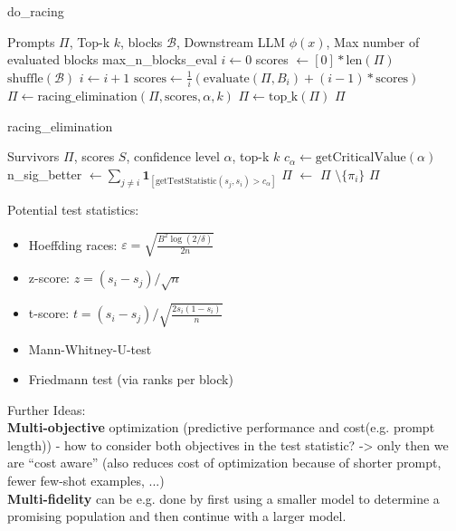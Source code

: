 \clearpage
\begin{algorithm}
    \caption{do\_racing}
    \begin{algorithmic}[1]
        \Require Prompts $\Pi$, Top-k $k$, blocks $\mathcal{B}$, Downstream LLM $\phi(x)$, Max number of evaluated blocks max\_n\_blocks\_eval
        \State $i \gets 0$
        \State scores $\gets [0]*\text{len}(\Pi)$
        \State $\text{shuffle}(\mathcal{B})$ 
        \State $i \gets i + 1$
        \State $\text{scores} \gets \frac{1}{i}\left(\text{evaluate}(\Pi, B_i) + (i-1)*\text{scores}\right)$ 
        \State $\Pi \gets \text{racing\_elimination}(\Pi, \text{scores}, \alpha, k)$
        \EndWhile
        \State $\Pi \gets \text{top\_k}(\Pi)$ 
        \EndIf
        \State \Return $\Pi$
    \end{algorithmic}
\end{algorithm}

\begin{algorithm}
    \caption{racing\_elimination}
    \begin{algorithmic}[1]
        \Require Survivors $\Pi$, scores $S$,  confidence level $\alpha$, top-k $k$
        \State $c_\alpha \gets \text{getCriticalValue}(\alpha)$
        \State n\_sig\_better $ \gets \sum_{j \neq i} \mathbf{1}_{\left[\text{getTestStatistic}(s_j, s_i) > c_{\alpha}\right]} $
        \State  $\Pi$ $\gets$  $\Pi$ $\setminus \{\pi_i\}$ 
        \EndIf
        \EndFor
        \State \Return  $\Pi$
    \end{algorithmic}
\end{algorithm}


Potential test statistics:
\begin{itemize}
    \item Hoeffding races: $\varepsilon = \sqrt{\frac{B^2\log(2/\delta)}{2n}}$
    \item z-score: $z = (s_i-s_j)/\sqrt{n}$
    \item t-score: $t = (s_i-s_j)/\sqrt{\frac{2s_i(1-s_i)}{n}}$
    \item Mann-Whitney-U-test
    \item Friedmann test (via ranks per block)
\end{itemize} 

Further Ideas:\\
\textbf{Multi-objective} optimization (predictive performance and cost(e.g. prompt length)) - how to consider both objectives in the test statistic? -> only then we are ``cost aware'' (also reduces cost of optimization because of shorter prompt, fewer few-shot examples, ...)\\
\textbf{Multi-fidelity} can be e.g. done by first using a smaller model to determine a promising population and then continue with a larger model.\\